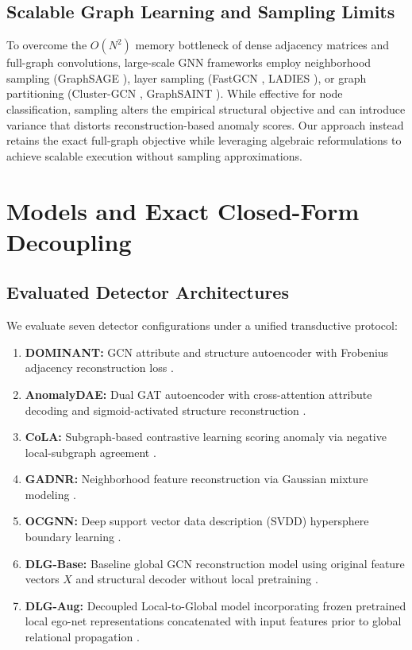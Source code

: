 \documentclass[applsci,article,submit,moreauthors,pdftex]{Definitions/mdpi}
\begin{document}
\subsection{Scalable Graph Learning and Sampling Limits}
To overcome the $O(N^2)$ memory bottleneck of dense adjacency matrices and full-graph convolutions, large-scale GNN frameworks employ neighborhood sampling (GraphSAGE \cite{hamilton2017graphsage}), layer sampling (FastGCN \cite{chen2018fastgcn}, LADIES \cite{zou2019ladies}), or graph partitioning (Cluster-GCN \cite{chiang2019clustergcn}, GraphSAINT \cite{zeng2020graphsaint}). While effective for node classification, sampling alters the empirical structural objective and can introduce variance that distorts reconstruction-based anomaly scores. Our approach instead retains the exact full-graph objective while leveraging algebraic reformulations to achieve scalable execution without sampling approximations.

\section{Models and Exact Closed-Form Decoupling}
\label{sec:models}

\subsection{Evaluated Detector Architectures}
We evaluate seven detector configurations under a unified transductive protocol:
\begin{enumerate}
    \item \textbf{DOMINANT:} GCN attribute and structure autoencoder with Frobenius adjacency reconstruction loss \cite{ding2019deep}.
    \item \textbf{AnomalyDAE:} Dual GAT autoencoder with cross-attention attribute decoding and sigmoid-activated structure reconstruction \cite{fan2020anomalydae}.
    \item \textbf{CoLA:} Subgraph-based contrastive learning scoring anomaly via negative local-subgraph agreement \cite{liu2022cola}.
    \item \textbf{GADNR:} Neighborhood feature reconstruction via Gaussian mixture modeling \cite{roy2024gadnr}.
    \item \textbf{OCGNN:} Deep support vector data description (SVDD) hypersphere boundary learning \cite{wang2021ocgnn}.
    \item \textbf{DLG-Base:} Baseline global GCN reconstruction model using original feature vectors $X$ and structural decoder without local pretraining \cite{park2026dlg}.
    \item \textbf{DLG-Aug:} Decoupled Local-to-Global model incorporating frozen pretrained local ego-net representations concatenated with input features prior to global relational propagation \cite{park2026dlg}.
\end{enumerate}
\end{document}
